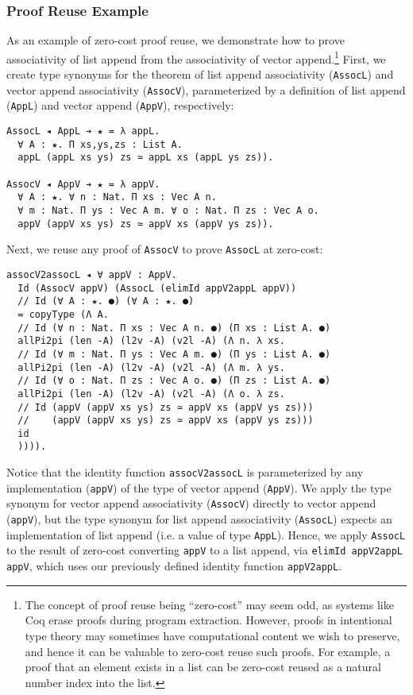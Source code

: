 \documentclass[acmsmall]{acmart}\settopmatter{}
\begin{document}
\subsubsection{Proof Reuse Example}

As an example of zero-cost proof reuse, we demonstrate how to prove
associativity of list append from the associativity of vector
append.\footnote{
  The concept of proof reuse being ``zero-cost'' may seem odd,
  as systems like Coq erase proofs during program
  extraction. However, proofs in intentional type theory may sometimes
  have computational content we wish to preserve,
  and hence it can be valuable to zero-cost reuse such proofs. For
  example, a proof that an element exists in a list can be zero-cost
  reused as a natural number index into the list.
}
First, we create type synonyms for the theorem of list append
associativity (\verb;AssocL;) and vector append associativity
(\verb;AssocV;), parameterized by a definition of list append
(\verb;AppL;) and vector append (\verb;AppV;), respectively:

\begin{verbatim}
AssocL ◂ AppL ➔ ★ = λ appL.
  ∀ A : ★. Π xs,ys,zs : List A.  
  appL (appL xs ys) zs ≃ appL xs (appL ys zs)).

AssocV ◂ AppV ➔ ★ = λ appV.
  ∀ A : ★. ∀ n : Nat. Π xs : Vec A n.
  ∀ m : Nat. Π ys : Vec A m. ∀ o : Nat. Π zs : Vec A o.
  appV (appV xs ys) zs ≃ appV xs (appV ys zs)).
\end{verbatim}
Next, we reuse any proof of \verb;AssocV; to prove
\verb;AssocL; at zero-cost:

\begin{verbatim}
assocV2assocL ◂ ∀ appV : AppV.
  Id (AssocV appV) (AssocL (elimId appV2appL appV))
  // Id (∀ A : ★. ●) (∀ A : ★. ●)
  = copyType (Λ A.
  // Id (∀ n : Nat. Π xs : Vec A n. ●) (Π xs : List A. ●)
  allPi2pi (len -A) (l2v -A) (v2l -A) (Λ n. λ xs.
  // Id (∀ m : Nat. Π ys : Vec A m. ●) (Π ys : List A. ●)
  allPi2pi (len -A) (l2v -A) (v2l -A) (Λ m. λ ys.
  // Id (∀ o : Nat. Π zs : Vec A o. ●) (Π zs : List A. ●)
  allPi2pi (len -A) (l2v -A) (v2l -A) (Λ o. λ zs.
  // Id (appV (appV xs ys) zs ≃ appV xs (appV ys zs)))
  //    (appV (appV xs ys) zs ≃ appV xs (appV ys zs)))
  id
  )))).
\end{verbatim}
Notice that the identity function \verb;assocV2assocL; is parameterized
by any implementation (\verb;appV;) of the type of vector append
(\verb;AppV;). We apply the type synonym for vector append associativity
(\verb;AssocV;) directly to vector append (\verb;appV;), but the type
synonym for list append associativity (\verb;AssocL;) expects an
implementation of list append (i.e. a value of type
\verb;AppL;). Hence, we apply \verb;AssocL; to the result of
zero-cost converting \verb;appV; to a list append, via
\verb;elimId appV2appL appV;, which uses our
previously defined identity function \verb;appV2appL;.
\end{document}
